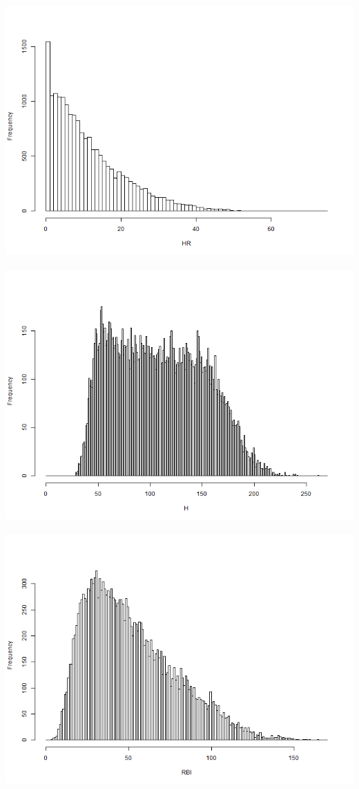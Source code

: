\documentclass[dvipdfmx]{jsarticle}
\begin{document}
\begin{center}
  \includegraphics[width=14cm, height = 10cm]{graphs/hist_HR_all.png}
  \includegraphics[width=14cm, height = 10cm]{graphs/hist_H_all.png}
  \includegraphics[width=14cm, height = 10cm]{graphs/hist_RBI_all.png}

\end{center}
\end{document}
